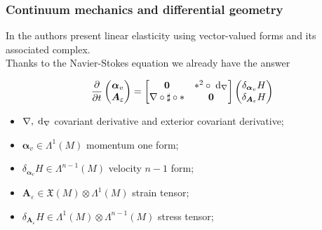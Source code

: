 \documentclass{beamer}
\begin{document}
\begin{frame}\frametitle{Continuum mechanics and differential geometry}
	In \cite{arnold2006acta} the authors present linear elasticity using vector-valued forms and its associated complex. \\
	\vspace{.5cm}
	Thanks to the Navier-Stokes equation we already have the answer
	
	\begin{equation*}
	\diffp{}{t}
	\begin{pmatrix}
		\bm{\alpha}_v \\ \bm{A}_\varepsilon
	\end{pmatrix}=
	\begin{bmatrix}
		\bm{0} & *^2 \circ \d{}_{\nabla} \\
		\nabla \circ \sharp \circ * & \bm{0}
	\end{bmatrix}
	\begin{pmatrix}
		\delta_{\bm{\alpha}_v}H \\ \delta_{\bm{A}_\varepsilon} H
	\end{pmatrix}
\end{equation*}

	\begin{itemize}
		\item $\nabla, \d{}_{\nabla}$ covariant derivative and exterior covariant derivative;
		\item $\bm{\alpha}_v \in \Lambda^1(M)$ momentum one form;
		\item $\delta_{\bm{\alpha}_v}H \in \Lambda^{n-1}(M)$ velocity $n-1$ form;
		\item $\bm{A}_\varepsilon \in \mathfrak{X}(M) \otimes \Lambda^1(M)$ strain tensor;
		\item $\delta_{\bm{A}_\varepsilon} H \in \Lambda^{1}(M) \otimes \Lambda^{n-1}(M)$ stress tensor;
	\end{itemize}
	
\end{frame}
\end{document}
